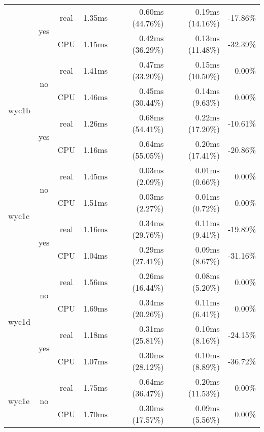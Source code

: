 \documentclass[en]{pracamgr}
\begin{document}
\begin{small}
\begin{longtable}{|l|c|c|r|r|r|r|}
                          \cline{2-7}
                          & \multirow{2}{*}{yes} & real & 1.35ms & 0.60ms (44.76\%) & 0.19ms (14.16\%) & -17.86\% \\*
                          &                      & CPU  & 1.15ms & 0.42ms (36.29\%) & 0.13ms (11.48\%) & -32.39\% \\
\hline
\multirow{4}{*}{wyc1b}    & \multirow{2}{*}{no}  & real & 1.41ms & 0.47ms (33.20\%) & 0.15ms (10.50\%) & 0.00\% \\*
                          &                      & CPU  & 1.46ms & 0.45ms (30.44\%) & 0.14ms (9.63\%) & 0.00\% \\*
                          \cline{2-7}
                          & \multirow{2}{*}{yes} & real & 1.26ms & 0.68ms (54.41\%) & 0.22ms (17.20\%) & -10.61\% \\*
                          &                      & CPU  & 1.16ms & 0.64ms (55.05\%) & 0.20ms (17.41\%) & -20.86\% \\
\hline
\multirow{4}{*}{wyc1c}    & \multirow{2}{*}{no}  & real & 1.45ms & 0.03ms (2.09\%) & 0.01ms (0.66\%) & 0.00\% \\*
                          &                      & CPU  & 1.51ms & 0.03ms (2.27\%) & 0.01ms (0.72\%) & 0.00\% \\*
                          \cline{2-7}
                          & \multirow{2}{*}{yes} & real & 1.16ms & 0.34ms (29.76\%) & 0.11ms (9.41\%) & -19.89\% \\*
                          &                      & CPU  & 1.04ms & 0.29ms (27.41\%) & 0.09ms (8.67\%) & -31.16\% \\
\hline
\multirow{4}{*}{wyc1d}    & \multirow{2}{*}{no}  & real & 1.56ms & 0.26ms (16.44\%) & 0.08ms (5.20\%) & 0.00\% \\*
                          &                      & CPU  & 1.69ms & 0.34ms (20.26\%) & 0.11ms (6.41\%) & 0.00\% \\*
                          \cline{2-7}
                          & \multirow{2}{*}{yes} & real & 1.18ms & 0.31ms (25.81\%) & 0.10ms (8.16\%) & -24.15\% \\*
                          &                      & CPU  & 1.07ms & 0.30ms (28.12\%) & 0.10ms (8.89\%) & -36.72\% \\
\hline
\multirow{4}{*}{wyc1e}    & \multirow{2}{*}{no}  & real & 1.75ms & 0.64ms (36.47\%) & 0.20ms (11.53\%) & 0.00\% \\*
                          &                      & CPU  & 1.70ms & 0.30ms (17.57\%) & 0.09ms (5.56\%) & 0.00\% \\*

\end{longtable}
\end{small}
\end{document}
